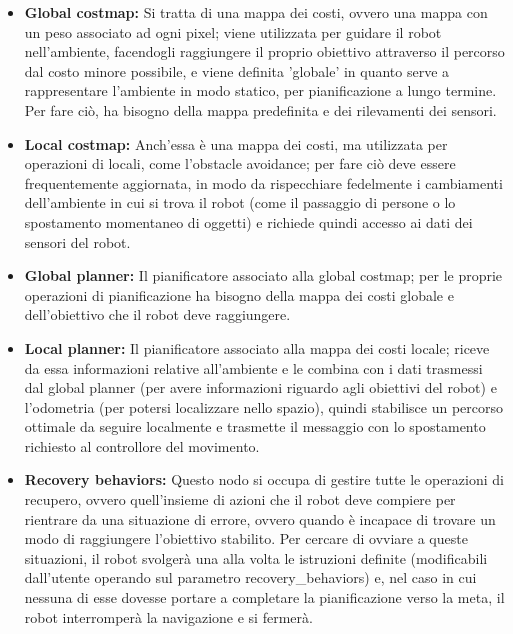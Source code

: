 \documentclass[Lau]{sapthesis}
\begin{document}
\begin{itemize}
\item \textbf{Global costmap:} Si tratta di una mappa dei costi, ovvero una mappa con un peso associato ad ogni pixel; viene utilizzata per guidare il robot nell'ambiente, facendogli raggiungere il proprio obiettivo attraverso il percorso dal costo minore possibile, e viene definita 'globale' in quanto serve a rappresentare l'ambiente in modo statico, per pianificazione a lungo termine. Per fare ciò, ha bisogno della mappa predefinita e dei rilevamenti dei sensori.
\item \textbf{Local costmap:} Anch'essa è una mappa dei costi, ma utilizzata per operazioni di locali, come l'obstacle avoidance; per fare ciò deve essere frequentemente aggiornata, in modo da rispecchiare fedelmente i cambiamenti dell'ambiente in cui si trova il robot (come il passaggio di persone o lo spostamento momentaneo di oggetti) e richiede quindi accesso ai dati dei sensori del robot.
\item \textbf{Global planner:} Il pianificatore associato alla global costmap; per le proprie operazioni di pianificazione ha bisogno della mappa dei costi globale e dell'obiettivo che il robot deve raggiungere.
\item \textbf{Local planner:} Il pianificatore associato alla mappa dei costi locale; riceve da essa informazioni relative all'ambiente e le combina con i dati trasmessi dal global planner (per avere informazioni riguardo agli obiettivi del robot) e l'odometria (per potersi localizzare nello spazio), quindi stabilisce un percorso ottimale da seguire localmente e trasmette il messaggio con lo spostamento richiesto al controllore del movimento.
\item \textbf{Recovery behaviors:} Questo nodo si occupa di gestire tutte le operazioni di recupero, ovvero quell'insieme di azioni che il robot deve compiere per rientrare da una situazione di errore, ovvero quando è incapace di trovare un modo di raggiungere l'obiettivo stabilito. Per cercare di ovviare a queste situazioni, il robot svolgerà una alla volta le istruzioni definite (modificabili dall'utente operando sul parametro recovery\_behaviors) e, nel caso in cui nessuna di esse dovesse portare a completare la pianificazione verso la meta, il robot interromperà la navigazione e si fermerà.
\end{itemize}
\end{document}
